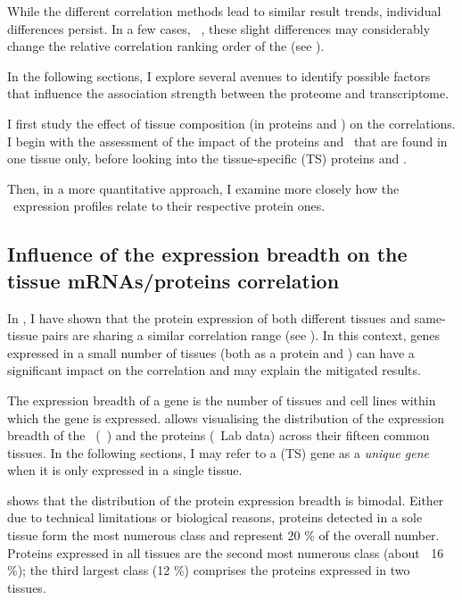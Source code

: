 While the different correlation methods lead to similar result trends,
individual differences persist.
In a few cases, \eg\ \heart,
these slight differences may considerably change
the relative correlation ranking order of the \treps{} (see ).\mybr\

In the following sections,
I explore several avenues to identify possible factors
that influence the association strength
between the proteome and transcriptome.\mybr\

I first study the effect of tissue composition (in proteins and \mRNAs)
on the correlations.
I begin with the assessment of the impact of the proteins and \mRNAs\
that are found in one tissue only,
before looking into the tissue-specific (\gls{TS}) proteins and \mRNAs{}.\mybr\

Then, in a more quantitative approach,
I examine more closely how the \mRNA\ expression profiles relate
to their respective protein ones.\mybr\

\subsection{Influence of the expression breadth on the tissue %
\texorpdfstring{\MakeLowercase{m}RNAs/proteins}{mRNAs/proteins} correlation}

In ,
I have shown that
the protein expression of both different tissues and same-tissue pairs
are sharing a similar correlation range
(see ).
In this context,
genes expressed in a small number of tissues
(both as a protein and \mRNA)
can have a significant impact on the correlation
and may explain the mitigated results.\mybr\

The expression breadth of a gene is
the number of tissues and cell lines within which the gene is expressed.
\Cref{fig:expressionBreadth} allows visualising
the distribution of the expression breadth of the \mRNAs\ (\uhlen\ \etal)
and the proteins (\pandey\ Lab data) across their fifteen common tissues.
In the following sections,
I may refer to a (\gls{TS}) gene as a \emph{unique gene}
when it is only expressed in a single tissue.\mybr\

 shows that
the distribution of the protein expression breadth is bimodal.
Either due to technical limitations or biological reasons,
proteins detected in a sole tissue form
the most numerous class and represent 20 \% of the overall number.
Proteins expressed in all tissues are the second most numerous class (about $~$ 16 \%);
the third largest class (12 \%) comprises the proteins expressed in two tissues.\mybr\

